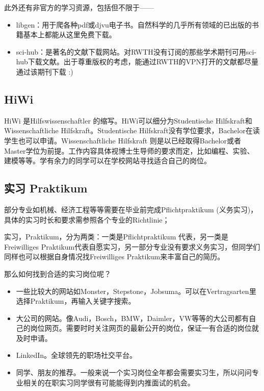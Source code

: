     此外还有非官方的学习资源，包括但不限于——

    \begin{itemize}
      \item libgen：用于爬各种pdf或djvu电子书。自然科学的几乎所有领域的已出版的书籍基本上都能从这里免费下载。
      \item sci-hub：是著名的文献下载网站。对RWTH没有订阅的那些学术期刊可用sci-hub下载文献。出于尊重版权的考虑，能通过RWTH的VPN打开的文献都尽量通过该期刊下载 :)
    \end{itemize}

  \subsection{HiWi}\label{subsec:HiWi}

    HiWi 是Hilfswissenschaftler 的缩写。HiWi可以细分为Studentische Hilfskraft和Wissenschaftliche Hilfskraft。Studentische Hilfskraft没有学位要求，Bachelor在读学生也可以申请。Wissenschaftliche Hilfskraft 则是以已经取得Bachelor或者Master学位为前提。工作内容具体视博士生导师的要求而定，比如编程、实验、建模等等。学有余力的同学可以在学校网站寻找适合自己的岗位。 

  \subsection{实习 Praktikum}\label{subsec:实习 Praktikum}

    部分专业如机械、经济工程等等需要在毕业前完成Pflichtpraktikum (义务实习)，具体的实习时长和要求需参照各个专业的Richtlinie；

    实习，Praktikum，分为两类：一类是Pflichtpraktikum 代表，另一类是Freiwilliges Praktikum代表自愿实习，另一部分专业没有要求义务实习，但同学们同样也可以根据自身情况找Freiwilliges Praktikum来丰富自己的简历。

    那么如何找到合适的实习岗位呢？

    \begin{itemize}
      \item 一些比较大的网站如Monster，Stepstone，Jobsuma。可以在Vertragsarten里选择Praktikum，再输入关键字搜索。
      \item 大公司的网站。像Audi，Bosch，BMW，Daimler，VW等等的大公司都有自己的岗位网页。需要时时关注网页的最新公开的岗位，保证一有合适的岗位就及时申请。
      \item LinkedIn。全球领先的职场社交平台。
      \item 同学、朋友的推荐。一般来说一个实习岗位全年都会需要实习生，所以问问专业相关的在职实习同学很有可能能得到内推面试的机会。
    \end{itemize}

